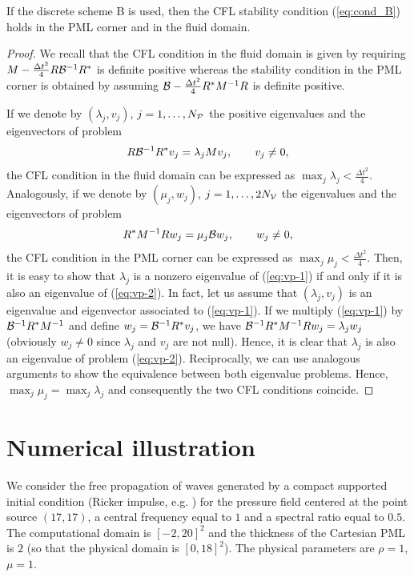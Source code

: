 \documentclass[a4paper]{article}
\begin{document}
\begin{Cor}
If the discrete scheme B is used, then the CFL stability condition 
(\ref{eq:cond_B}) holds in the PML corner and in the fluid domain.
\end{Cor}
\begin{proof}
We recall that the CFL condition in the fluid domain is given by requiring
$M-\frac{\Delta t^2}{4} R {\cal B}^{-1} R^{*}$ is definite positive
whereas the stability condition in the PML corner is obtained
by assuming ${\cal B}-\frac{\Delta t^2}{4} R^{*} M^{-1}R$ is definite positive.

If we denote by $(\lambda_j,v_j)$, $j=1,\ldots, N_{\cal P}$ the 
positive eigenvalues and the eigenvectors of problem
\begin{equation}
\label{eq:vp-1}
 R {\cal B}^{-1} R^{*} v_j=\lambda_j Mv_j,\qquad v_{j}\ne 0,
\end{equation}
the CFL condition in the fluid domain can be expressed as 
$\max_j \lambda_j < \frac{\Delta t^2}{4}$. 
Analogously, if we denote by $(\mu_j,w_j)$, $j=1,\ldots,2N_{\cal V}$ the eigenvalues and the eigenvectors of problem
\begin{equation}
\label{eq:vp-2}
 R^{*} {M}^{-1} R w_j=\mu_j {\cal B}w_j,\qquad w_{j}\ne 0,
\end{equation}
the CFL condition in the PML corner can be expressed as 
$\max_j \mu_j < \frac{\Delta t^2}{4}$. 
Then, it is easy to show that $\lambda_j$ is a nonzero eigenvalue of 
(\ref{eq:vp-1}) if and only if it is also an eigenvalue of (\ref{eq:vp-2}).
In fact, let us assume that $(\lambda_j,v_j)$ is an eigenvalue and 
eigenvector associated to (\ref{eq:vp-1}). If we multiply (\ref{eq:vp-1}) 
by ${\cal B}^{-1}R^*M^{-1}$ and define $w_j={\cal B}^{-1}R^*v_j$, we have
${\cal B}^{-1}R^*M^{-1}Rw_j=\lambda_j w_j$ (obviously $w_{j}\ne 0$ since
$\lambda_{j}$ and $v_{j}$ are not null). Hence, it is clear that 
$\lambda_j$ is also an eigenvalue of problem (\ref{eq:vp-2}).
Reciprocally, we can use analogous arguments to show the equivalence 
between both eigenvalue problems. Hence, $\max_j \mu_j= \max_j \lambda_j$
and consequently the two CFL conditions coincide. 
\end{proof}

\section{Numerical illustration}
\label{sec:num}
We consider the free propagation of waves generated by a compact supported 
initial condition (Ricker impulse, e.g. \cite{fauqueux}) for the pressure 
field centered at the point source $(17,17)$, a central frequency equal 
to $1$ and a spectral ratio equal to $0.5$. The computational domain is 
$[-2, 20]^2$ and the thickness of the Cartesian PML is $2$ (so that 
the physical domain is $[ 0, 18]^2$). 
The physical parameters are $\rho=1$, $\mu=1$. 
\end{document}

